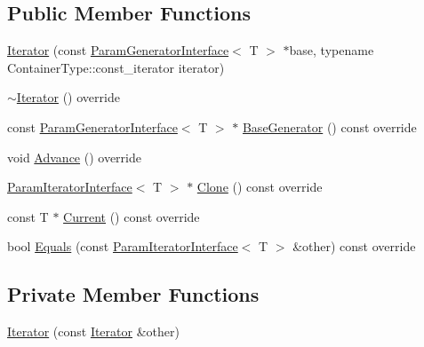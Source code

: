 \subsection*{Public Member Functions}
\begin{DoxyCompactItemize}
\item 
\hyperlink{classtesting_1_1internal_1_1ValuesInIteratorRangeGenerator_1_1Iterator_aebd635efe7082e6fc45bb8ae0dbefd2e}{Iterator} (const \hyperlink{classtesting_1_1internal_1_1ParamGeneratorInterface}{Param\+Generator\+Interface}$<$ T $>$ $\ast$base, typename Container\+Type\+::const\+\_\+iterator iterator)
\item 
\hyperlink{classtesting_1_1internal_1_1ValuesInIteratorRangeGenerator_1_1Iterator_a265c1facb4cbd4669686d5f331df4a95}{$\sim$\+Iterator} () override
\item 
const \hyperlink{classtesting_1_1internal_1_1ParamGeneratorInterface}{Param\+Generator\+Interface}$<$ T $>$ $\ast$ \hyperlink{classtesting_1_1internal_1_1ValuesInIteratorRangeGenerator_1_1Iterator_a27445e4d010ffde9d3f2f9ada5d54d0f}{Base\+Generator} () const override
\item 
void \hyperlink{classtesting_1_1internal_1_1ValuesInIteratorRangeGenerator_1_1Iterator_a5ff56489536cf5d90ed0ac07ffeb476b}{Advance} () override
\item 
\hyperlink{classtesting_1_1internal_1_1ParamIteratorInterface}{Param\+Iterator\+Interface}$<$ T $>$ $\ast$ \hyperlink{classtesting_1_1internal_1_1ValuesInIteratorRangeGenerator_1_1Iterator_a2c5ccf4da12cfb089829438d679ae35e}{Clone} () const override
\item 
const T $\ast$ \hyperlink{classtesting_1_1internal_1_1ValuesInIteratorRangeGenerator_1_1Iterator_a55bd2a0d5a630478e32ec2efe08e37e4}{Current} () const override
\item 
bool \hyperlink{classtesting_1_1internal_1_1ValuesInIteratorRangeGenerator_1_1Iterator_a75604bc318aca22ff8607b68bfb44e96}{Equals} (const \hyperlink{classtesting_1_1internal_1_1ParamIteratorInterface}{Param\+Iterator\+Interface}$<$ T $>$ \&other) const override
\end{DoxyCompactItemize}
\subsection*{Private Member Functions}
\begin{DoxyCompactItemize}
\item 
\hyperlink{classtesting_1_1internal_1_1ValuesInIteratorRangeGenerator_1_1Iterator_a87cadeed020bb8bfbdce636fca31b9ef}{Iterator} (const \hyperlink{classtesting_1_1internal_1_1ValuesInIteratorRangeGenerator_1_1Iterator}{Iterator} \&other)
\end{DoxyCompactItemize}
